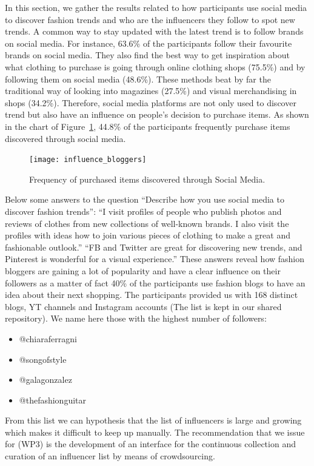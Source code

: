 In this section, we gather the results related to how participants use social media to discover fashion trends and who are the influencers they follow to spot new trends.
A common way to stay updated with the latest trend is to follow brands on social media. For instance, 63.6\% of the participants follow their favourite brands on social media. They also find the best way to get inspiration about what clothing to purchase is going through online clothing shops (75.5\%) and by following them on social media (48.6\%). These methods beat by far the traditional way of looking into magazines (27.5\%) and visual merchandising in shops (34.2\%). Therefore, social media platforms are not only used to discover trend but also have an influence on people's decision to purchase items. As shown in the chart of Figure~\ref{fig:freq}, 44.8\% of the participants frequently purchase items discovered through social media. 


\begin{figure}[htb] \centering 
  \texttt{[image: influence\_bloggers]}
  \caption{Frequency of purchased items discovered through Social Media.}
  \label{fig:freq}
\end{figure}

Below some answers to the question “Describe how you use social media to discover fashion trends”:
“I visit profiles of people who publish photos and reviews of clothes from new collections of well-known brands. I also visit the profiles with ideas how to join various pieces of clothing to make a great and fashionable outlook.”
“\ac{FB} and Twitter are great for discovering new trends, and Pinterest is wonderful for a visual experience.”
These answers reveal how fashion bloggers are gaining a lot of popularity and have a clear influence on their followers as a matter of fact 40\% of the participants use fashion blogs to have an idea about their next shopping.
The participants provided us with 168 distinct blogs, \ac{YT} channels and Instagram accounts (The list is kept in our shared repository). We name here those with the highest number of followers:

\begin{itemize}
    \item @chiaraferragni
    \item @songofstyle 
    \item @galagonzalez
    \item @thefashionguitar
\end{itemize}

From this list we can hypothesis that the list of influencers is large and growing which makes it difficult to keep up manually. The recommendation that we issue for (WP3) is the development of an interface for the continuous collection and curation of an influencer list by means of crowdsourcing.


